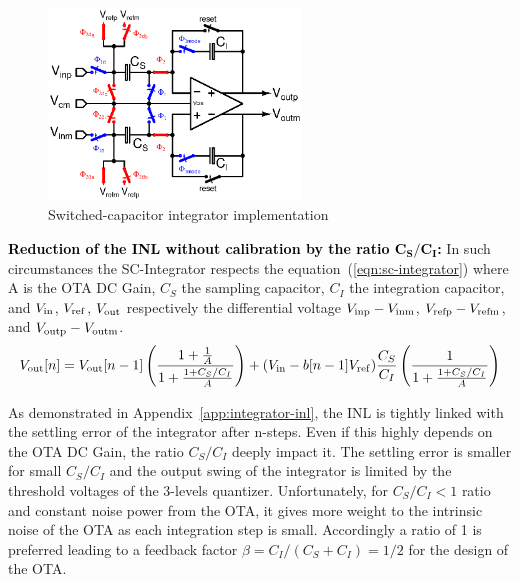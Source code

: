 \begin{figure}[htp]
	\centering
	\includegraphics[width=0.6\textwidth]{Chapter4/Figs/sc-integrator-isd.ps}
	\caption{Switched-capacitor integrator implementation}
	\label{fig:isd-sc-integrator}
\end{figure}

\textbf{\textcolor{black}{Reduction of the INL without calibration by the ratio $\mathbf{C_S/C_I}$:}}
In such circumstances the SC-Integrator respects the equation~(\ref{eqn:sc-integrator}) where A is the OTA DC Gain, \(C_S \) the sampling capacitor, \(C_I \) the integration capacitor, and \(V_{\rm in} \), \(V_{\rm ref} \), \(V_{\rm out} \) respectively the differential voltage \(V_{\rm inp}-V_{\rm inm} \), \(V_{\rm refp}-V_{\rm refm} \), and \(V_{\rm outp}-V_{\rm outm} \).
\begin{equation}
    \label{eqn:sc-integrator}
    V_{\rm out}[n] = V_{\rm out}[n-1] \left(\frac{1+\frac{1}{A}}{1+\frac{1+C_S/C_I}{A}}\right) + (V_{\rm in}-b[n-1]V_{\rm ref})\frac{C_S}{C_I}\left(\frac{1}{1+\frac{1+C_S/C_I}{A}}\right)
\end{equation}

As demonstrated in Appendix~\ref{app:integrator-inl}, the INL is tightly linked with the settling error of the integrator after n-steps. Even if this highly depends on the OTA DC Gain, the ratio \(C_S/C_I \) deeply impact it. The settling error is smaller for small \(C_S/C_I \) and the output swing of the integrator is limited by the threshold voltages of the 3-levels quantizer. Unfortunately, for \(C_S/C_I < 1\) ratio and constant noise power from the OTA, it gives more weight to the intrinsic noise of the OTA as each integration step is small. Accordingly a ratio of 1 is preferred leading to a feedback factor \(\beta = C_I/(C_S+C_I) = 1/2 \) for the design of the OTA\@.

